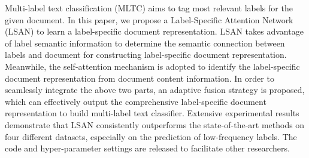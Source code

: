 Multi-label text classification (MLTC) aims to tag most relevant labels for the given document. In this paper, we propose a Label-Specific Attention Network (LSAN) to learn a label-specific document representation. LSAN takes advantage of label semantic information to determine the semantic connection between labels and document for constructing label-specific document representation. Meanwhile, the self-attention mechanism is adopted to identify the label-specific document representation from document content information.  In order to seamlessly integrate the above two parts, an adaptive fusion strategy is proposed, which can effectively output the comprehensive label-specific document representation to build multi-label text classifier. Extensive experimental results demonstrate that LSAN consistently outperforms the state-of-the-art methods on four different datasets, especially on the prediction of low-frequency labels. The code and hyper-parameter settings are released to facilitate other researchers.